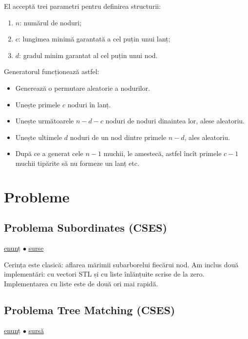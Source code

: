 \documentclass[../main.tex]{subfiles}
\begin{document}
El acceptă trei parametri pentru definirea structurii:

\begin{enumerate}
  \item $n$: numărul de noduri;
  \item $c$: lungimea minimă garantată a cel puțin unui lanț;
  \item $d$: gradul minim garantat al cel puțin unui nod.
\end{enumerate}

Generatorul funcționează astfel:

\begin{itemize}
  \item Generează o permutare aleatorie a nodurilor.
  \item Unește primele $c$ noduri în lanț.
  \item Unește următoarele $n - d - c$ noduri de noduri dinaintea lor, alese aleatoriu.
  \item Unește ultimele $d$ noduri de un nod dintre primele $n - d$, ales aleatoriu.
  \item După ce a generat cele $n-1$ muchii, le amestecă, astfel încît primele $c-1$ muchii tipărite să nu formeze un lanț etc.
\end{itemize}

\section{Probleme}

\subsection{Problema Subordinates (CSES)}
\label{problem:subordinates}

\href{https://cses.fi/problemset/task/1674}{enunț}
$\bullet$
\hyperref[code:subordinates]{surse}

Cerința este clasică: aflarea mărimii subarborelui fiecărui nod. Am inclus două implementări: cu vectori STL și cu liste înlănțuite scrise de la zero. Implementarea cu liste este de două ori mai rapidă.

\subsection{Problema Tree Matching (CSES)}
\label{problem:tree-matching}

\href{https://cses.fi/problemset/task/1130}{enunț}
$\bullet$
\hyperref[code:tree-matching]{sursă}
\end{document}
